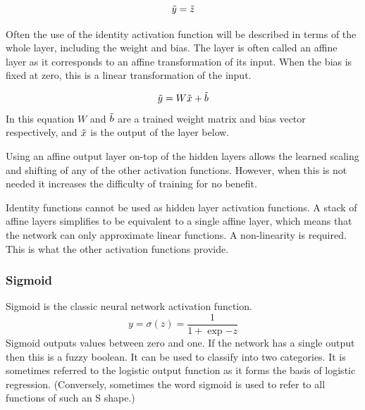 \documentclass[12pt,parskip]{komatufte}
\begin{document}
\begin{equation}
\tilde{y}= \tilde{z}
\end{equation}

Often the use of the identity activation function will be described in terms of the whole layer, including the weight and bias.
The layer is often called an affine layer as it corresponds to an affine transformation of its input.
When the bias is fixed at zero, this is a linear transformation of the input.

\begin{equation}
\tilde{y}=W \tilde{x} + \tilde{b}
\end{equation}
In this equation $W$ and $\tilde{b}$ are a trained weight matrix and bias vector respectively,
and $\tilde{x}$ is the output of the layer below.

Using an affine output layer on-top of the hidden layers
allows the learned scaling and shifting of any of the other activation functions.
However, when this is not needed it increases the difficulty of training for no benefit.

Identity functions cannot be used as hidden layer activation functions.
A stack of affine layers simplifies to be equivalent to a single affine layer, which means that the network can only approximate linear functions.
A non-linearity is required.
This is what the other activation functions provide.


\subsubsection{Sigmoid}


Sigmoid is the classic neural network activation function.
\begin{equation}
y=\sigma(z)=\frac{1}{1+\exp{-z}}
\end{equation}
Sigmoid outputs values between zero and one.
If the network has a single output then this is a fuzzy boolean.
It can be used to classify into two categories.
It is sometimes referred to the logistic output function as it forms the basis of logistic regression.
(Conversely, sometimes the word sigmoid is used to refer to all functions of such an S shape.)
\end{document}
